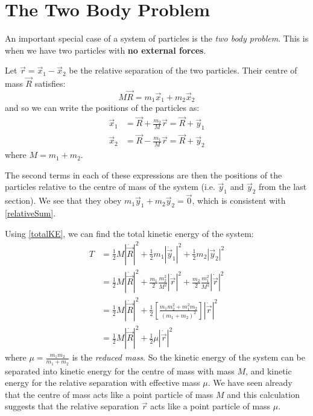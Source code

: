 \documentclass[../main.tex]{subfiles}
\begin{document}
\section{The Two Body Problem}
An important special case of a system of particles is the \textit{two body problem}.
This is when we have two particles with \textbf{no external forces}.

Let $\vec{r} = \vec{x}_1 - \vec{x}_2$ be the relative separation of the two particles.
Their centre of mass $\vec{R}$ satisfies:
\[
  M \vec{R} = m_1 \vec{x}_1 + m_2 \vec{x}_2
\]
and so we can write the positions of the particles as:
\begin{align*}
  \vec{x}_1 &= \vec{R} + \frac{m_2}{M}\vec{r} = \vec{R} + \vec{y}_1 \\
  \vec{x}_2 &= \vec{R} - \frac{m_1}{M}\vec{r} = \vec{R} + \vec{y}_2
\end{align*}
where $M = m_1 + m_2$.

The second terms in each of these expressions are then the positions of the particles relative to the centre of mass of the system (i.e. $\vec{y}_1$ and $\vec{y}_2$ from the last section).
We see that they obey $m_1\vec{y}_1 + m_2\vec{y}_2 = \vec{0}$, which is consistent with \cref{relativeSum}.

Using \cref{totalKE}, we can find the total kinetic energy of the system:
\begin{align}
  T &= \frac{1}{2}M |\dot{\vec{R}}|^2 + \frac{1}{2}m_1 |\dot{\vec{y}}_1|^2 + \frac{1}{2}m_2 |\vec{y}_2|^2 \nonumber \\
    &= \frac{1}{2}M |\dot{\vec{R}}|^2 + \frac{m_1}{2} \frac{m^2_2}{M^2} |\dot{\vec{r}}|^2 + \frac{m_2}{2} \frac{m^2_1}{M^2} |\dot{\vec{r}}|^2 \nonumber \\
    &= \frac{1}{2}M |\dot{\vec{R}}|^2 + \frac{1}{2}\left[\frac{m_1m^2_2 + m^2_1m_2}{(m_1 + m_2)^2}\right]|\dot{\vec{r}}|^2 \nonumber \\
    &= \frac{1}{2}M |\dot{\vec{R}}|^2 + \frac{1}{2} \mu |\dot{\vec{r}}|^2 \label{totalKE2Body}
\end{align}
where $\mu = \frac{m_1 m_2}{m_1 + m_2}$ is the \textit{reduced mass}.
So the kinetic energy of the system can be separated into kinetic energy for the centre of mass with mass $M$, and kinetic energy for the relative separation with effective mass $\mu$.
We have seen already that the centre of mass acts like a point particle of mass $M$ and this calculation suggests that the relative separation $\vec{r}$ acts like a point particle of mass $\mu$.
\end{document}
